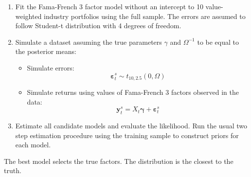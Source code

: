 \documentclass[12pt]{article}
\begin{document}
\begin{enumerate}
	\item Fit the Fama-French 3 factor model without an intercept to 10 value-weighted industry portfolios using the full sample. The errors are assumed to follow Student-t distribution with 4 degrees of freedom. 
	\item Simulate a dataset assuming the true parameters  $\gamma$ and $\Omega^{-1} $ to be equal to the posterior means:
	\begin{itemize}
		\item Simulate errors:
		 \begin{equation*}
		 \boldsymbol{\varepsilon}^s_{t}\sim t_{10,2.5 }\left( 0,\Omega \right)
		 \end{equation*}
		\item Simulate returns using values of Fama-French 3 factors observed in the data:
		\begin{equation*}
		\mathbf{y}_t^s = X_t \boldsymbol{\gamma} + \boldsymbol{\varepsilon}^s_t
		\end{equation*}
	\end{itemize}
	\item Estimate all candidate models and evaluate the likelihood. Run the usual two step estimation procedure using the training sample to construct priors for each model.  
\end{enumerate}


The best model selects the true factors. The distribution  is the closest to the truth. \\
\end{document}
